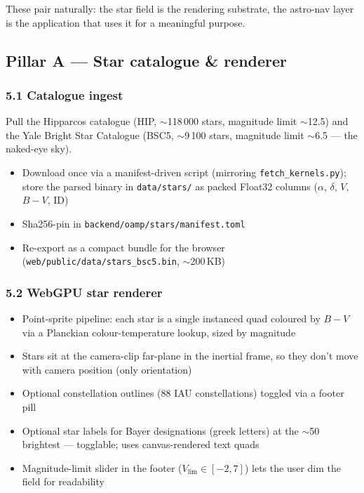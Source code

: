 \documentclass[11pt, a4paper]{article}
\begin{document}
These pair naturally: the star field is the rendering substrate, the
astro-nav layer is the application that uses it for a meaningful purpose.

\subsection{Pillar A --- Star catalogue \& renderer}

\subsubsection{5.1 Catalogue ingest}

Pull the Hipparcos catalogue (HIP, $\sim$118\,000 stars, magnitude limit
$\sim$12.5) and the Yale Bright Star Catalogue (BSC5, $\sim$9\,100 stars,
magnitude limit $\sim$6.5 --- the naked-eye sky).

\begin{itemize}[leftmargin=*]
  \item Download once via a manifest-driven script (mirroring
        \texttt{fetch\_kernels.py}); store the parsed binary in
        \texttt{data/stars/} as packed Float32 columns
        ($\alpha$, $\delta$, $V$, $B-V$, ID)
  \item Sha256-pin in \texttt{backend/oamp/stars/manifest.toml}
  \item Re-export as a compact bundle for the browser
        (\texttt{web/public/data/stars\_bsc5.bin}, $\sim$200\,KB)
\end{itemize}

\subsubsection{5.2 WebGPU star renderer}

\begin{itemize}[leftmargin=*]
  \item Point-sprite pipeline: each star is a single instanced quad
        coloured by $B-V$ via a Planckian colour-temperature lookup,
        sized by magnitude
  \item Stars sit at the camera-clip far-plane in the inertial frame, so
        they don't move with camera position (only orientation)
  \item Optional constellation outlines (88 IAU constellations) toggled
        via a footer pill
  \item Optional star labels for Bayer designations (greek letters) at the
        $\sim$50 brightest --- togglable; uses canvas-rendered text quads
  \item Magnitude-limit slider in the footer
        ($V_\text{lim} \in [-2, 7]$) lets the user dim the field for
        readability
\end{itemize}
\end{document}
